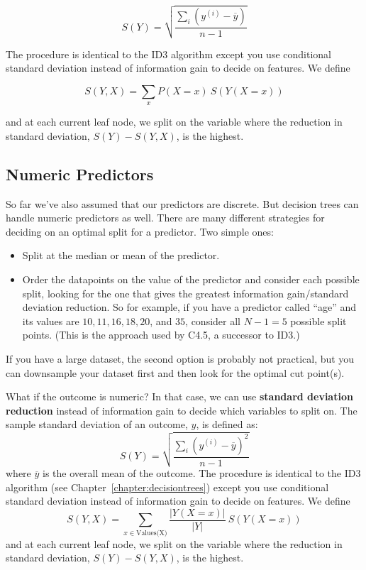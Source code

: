 $$ S(Y) = \sqrt{\frac{\sum_i(y^{(i)} - \overline{y})}{n-1}} $$

The procedure is identical to the ID3 algorithm except you use conditional standard deviation instead of information gain to decide on features. We define

$$ S(Y, X) = \sum_{x} P(X = x)~ S(Y(X=x)) $$

and at each current leaf node, we split on the variable where the reduction in standard deviation, $S(Y) - S(Y,X)$, is the highest. 

\subsection{Numeric Predictors}

So far we've also assumed that our predictors are discrete. But decision trees can handle numeric predictors as well. There are many different strategies for deciding on an optimal split for a predictor. Two simple ones:

\begin{itemize}
\item Split at the median or mean of the predictor.
\item Order the datapoints on the value of the predictor and consider each possible split, looking for the one that gives the greatest information gain/standard deviation reduction. So for example, if you have a predictor called ``age'' and its values are $10, 11, 16, 18, 20$, and $35$, consider all $N-1 = 5$ possible split points. (This is the approach used by C4.5, a successor to ID3.) 
\end{itemize}

If you have a large dataset, the second option is probably not practical, but you can downsample your dataset first and then look for the optimal cut point(s).

What if the outcome is numeric? In that case, we can use \textbf{standard deviation reduction} instead of information gain to decide which variables to split on. The sample standard deviation of an outcome, $y$, is defined as:
$$ S(Y) = \sqrt{\frac{\sum_i(y^{(i)} - \overline{y})^2}{n-1}} $$
where $\overline{y}$ is the overall mean of the outcome. The procedure is identical to the ID3 algorithm (see Chapter~\ref{chapter:decisiontrees}) except you use conditional standard deviation instead of information gain to decide on features. We define
$$ S(Y, X) = \sum_{x \in \text{Values(X)}} \frac{|Y(X=x)|}{|Y|}~ S(Y(X=x)) $$
and at each current leaf node, we split on the variable where the reduction in standard deviation, $S(Y) - S(Y,X)$, is the highest.

